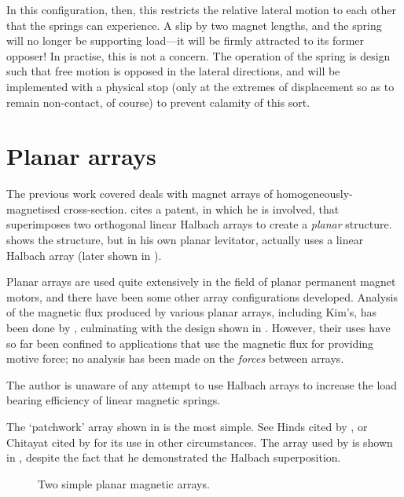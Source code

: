 In this configuration, then, this restricts the relative lateral motion to
each other that the springs can experience. A slip by two magnet lengths, and
the spring will no longer be supporting load---it will be firmly attracted to
its former opposer! In practise, this is not a concern. The operation of the
spring is design such that free motion is opposed in the lateral directions,
and will be implemented with a physical stop (only at the extremes of
displacement so as to remain non-contact, of course) to prevent calamity of
this sort.

\section{Planar arrays}

The previous work covered deals with magnet arrays of homogeneously-magnetised
cross-section. \textcite{kim1997} cites a patent, in which he is involved,
that superimposes two orthogonal linear Halbach arrays to create a
\emph{planar} structure.  shows the structure, but in his
own planar levitator, \citeauthor{kim1997} actually uses a linear Halbach
array (later shown in ).

Planar arrays are used quite extensively in the field of planar permanent
magnet motors, and there have been some other array configurations developed.
Analysis of the magnetic flux produced by various planar arrays, including
Kim's, has been done by \textcite{cho2001}, culminating with the
design shown in . However, their uses have so far
been confined to applications that use the magnetic flux for providing motive
force; no analysis has been made on the \emph{forces} between arrays.

The author is unaware of any attempt to use Halbach arrays to increase the load
bearing efficiency of linear magnetic springs.

The `patchwork' array shown in  is the most simple. See Hinds
cited by \textcite{kim1997}, or Chitayat cited by \textcite{cho2001} for its
use in other circumstances. The array used by \citeauthor{kim1997} is shown in
, despite the fact that he demonstrated the Halbach
superposition. 

\begin{figure}
  \hfil
  \caption{Two simple planar magnetic arrays.}
\end{figure}

